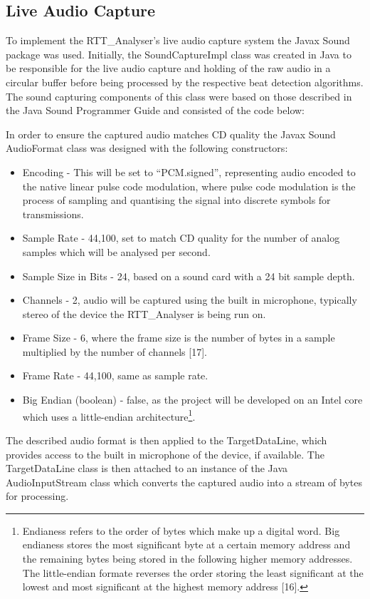 \documentclass[a4paper, 11pt]{article}
\begin{document}
\subsection{Live Audio Capture}
To implement the RTT\_Analyser's live audio capture system the Javax Sound package was used. Initially, the SoundCaptureImpl class was created in Java to be responsible for the live audio capture and holding of the raw audio in a circular buffer before being processed by the respective beat detection algorithms. The sound capturing components of this class were based on those described in the Java Sound Programmer Guide\cite{javasound} and consisted of the code below:

In order to ensure the captured audio matches CD quality the Javax Sound AudioFormat class was designed with the following constructors: 

\begin{itemize}
\item Encoding - This will be set to ``PCM.signed'', representing audio encoded to the native linear pulse code modulation, where pulse code modulation is the process of sampling and quantising the signal into discrete symbols for transmissions\cite{pulseWag}.
\item Sample Rate - 44,100, set to match CD quality for the number of analog samples which will be analysed per second. 
\item Sample Size in Bits - 24, based on a sound card with a 24 bit sample depth.
\item Channels - 2, audio will be captured using the built in microphone, typically stereo of the device the RTT\_Analyser is being run on.
\item Frame Size - 6, where the frame size is the number of bytes in a sample multiplied by the number of channels [17].
\item Frame Rate - 44,100, same as sample rate.
\item Big Endian (boolean) - false, as the project will be developed on an Intel core which uses a little-endian architecture\footnote{Endianess refers to the order of bytes which make up a digital word. Big endianess stores the most significant byte at a certain memory address and the remaining bytes being stored in the following higher memory addresses. The little-endian formate reverses the order storing the least significant at the lowest and most significant at the highest memory address [16].}.
\end{itemize}

The described audio format is then applied to the TargetDataLine, which provides access to the built in microphone of the device, if available. The TargetDataLine class is then attached to an instance of the Java AudioInputStream class which converts the captured audio into a stream of bytes for processing\cite{soundTrail}. 
\end{document}
